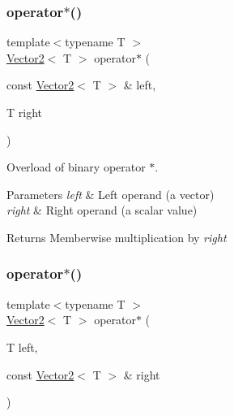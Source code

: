 \subsubsection{\texorpdfstring{operator$\ast$()}{operator*()}\hspace{0.1cm}{\footnotesize\ttfamily [1/2]}}
{\footnotesize\ttfamily template$<$typename T $>$ \\
\hyperlink{classsf_1_1_vector2}{Vector2}$<$ T $>$ operator$\ast$ (\begin{DoxyParamCaption}\item[{const \hyperlink{classsf_1_1_vector2}{Vector2}$<$ T $>$ \&}]{left,  }\item[{T}]{right }\end{DoxyParamCaption})\hspace{0.3cm}{\ttfamily [related]}}



Overload of binary operator $\ast$. 


\begin{DoxyParams}{Parameters}
{\em left} & Left operand (a vector) \\
\hline
{\em right} & Right operand (a scalar value)\\
\hline
\end{DoxyParams}
\begin{DoxyReturn}{Returns}
Memberwise multiplication by {\itshape right} 
\end{DoxyReturn}
\mbox{\label{classsf_1_1_vector2_ad8b3e1cf7b156a984bc1427539ca8605}} 
\subsubsection{\texorpdfstring{operator$\ast$()}{operator*()}\hspace{0.1cm}{\footnotesize\ttfamily [2/2]}}
{\footnotesize\ttfamily template$<$typename T $>$ \\
\hyperlink{classsf_1_1_vector2}{Vector2}$<$ T $>$ operator$\ast$ (\begin{DoxyParamCaption}\item[{T}]{left,  }\item[{const \hyperlink{classsf_1_1_vector2}{Vector2}$<$ T $>$ \&}]{right }\end{DoxyParamCaption})\hspace{0.3cm}{\ttfamily [related]}}



